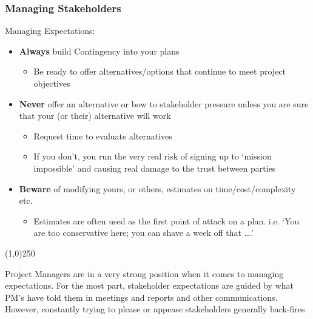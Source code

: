 \begin{frame}
\frametitle{Managing Stakeholders}
Managing Expectations:\\
\begin{itemize}
	\item \textbf{Always} build Contingency into your plans
		\begin{itemize}
			\item Be ready to offer alternatives/options that continue to meet project objectives
		\end{itemize}
	\item \textbf{Never} offer an alternative or bow to stakeholder pressure unless you are sure that your (or their) alternative will work
			\begin{itemize}
			\item Request time to evaluate alternatives
			\item If you don't, you run the very real risk of signing up to `mission impossible' and causing real damage to the trust between parties
			\end{itemize}
	\item \textbf{Beware} of modifying yours, or others, estimates on time/cost/complexity etc.
		\begin{itemize}
		\item Estimates are often used as the first point of attack on a plan. i.e. `You are too conservative here; you can shave a week off that \ldots.'
		\end{itemize} 
\end{itemize}
\end{frame}
\begin{center}\line(1,0){250}\end{center}
Project Managers are in a very strong position when it comes to managing expectations.  For the most part, stakeholder expectations are guided by what PM's have told them in meetings and reports and other communications.  However, constantly trying to please or appease stakeholders generally back-fires.  


